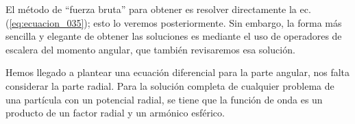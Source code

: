 El método de \enquote{fuerza bruta} para obtener es resolver directamente la ec. (\ref{eq:ecuacion_035}); esto lo veremos posteriormente. Sin embargo, la forma más sencilla y elegante de obtener las soluciones es mediante el uso de operadores de escalera del momento angular, que también revisaremos esa solución.
\par
Hemos llegado a plantear una ecuación diferencial para la parte angular, nos falta considerar la parte radial. Para la solución completa de cualquier problema de una partícula con un potencial radial, se tiene que la función de onda es un producto de un factor radial y un armónico esférico.

